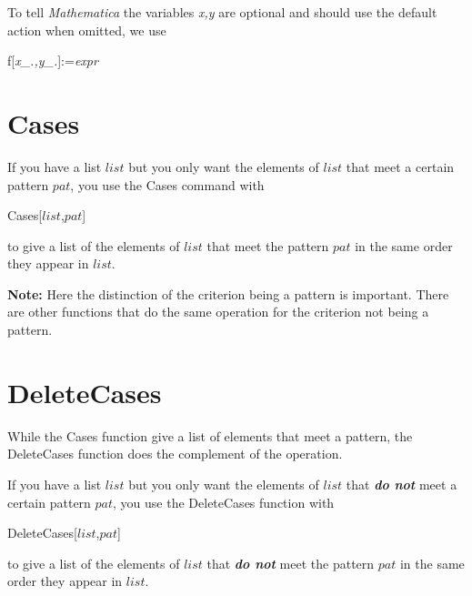 \documentclass[11pt,letterpaper,twoside,titlepage]{book}
\newcommand{\Mathematica}{\textit{Mathematica} }
\begin{document}
				To tell \Mathematica the variables \emph{x,y} are optional and should use the default action when omitted, we use
				
				\begin{center}
				
					f[\emph{x\_.,y\_.}]:=\emph{expr}
				
				\end{center}
				
			\section{Cases}
			
				If you have a list $list$ but you only want the elements of $list$ that meet a certain pattern $pat$, you use the Cases command with
				
				\begin{center}
				
					Cases[$list$,$pat$]
				
				\end{center}
				
				to give a list of the elements of $list$ that meet the pattern $pat$ in the same order they appear in $list$.
				
				\textbf{Note:} Here the distinction of the criterion being a pattern is important.  There are other functions that do the same operation for the criterion not being a pattern.
		
			\section{DeleteCases}
			
				While the Cases function give a list of elements that meet a pattern, the DeleteCases function does the complement of the operation.
				
				If you have a list $list$ but you only want the elements of $list$ that \textbf{\emph{do not}} meet a certain pattern $pat$, you use the DeleteCases function with
				
				\begin{center}
				
					DeleteCases[$list$,$pat$]
				
				\end{center}
				
				to give a list of the elements of $list$ that \textbf{\emph{do not}} meet the pattern $pat$ in the same order they appear in $list$.
			
\end{document}
